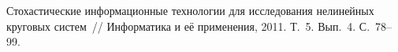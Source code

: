 \begin{multicols}{2}
{{\begin{thebibliography}{99}
\label{end\stat}
      Стохастические информационные технологии для 
исследования нелинейных круговых сис\-тем~// Информатика и её применения, 
2011. Т.~5. Вып.~4. С.~78--99.



\end{thebibliography}
}
}


\end{multicols}     
     
     
     
     
